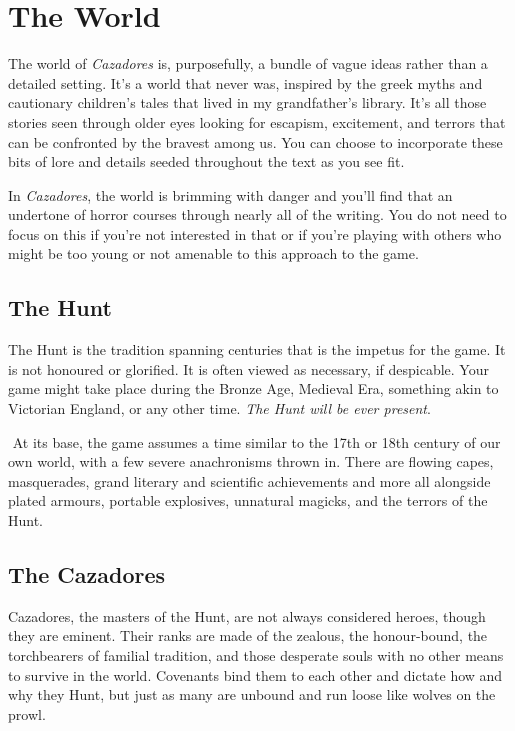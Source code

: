 \documentclass[
]{book}
\begin{document}
\hypertarget{worldsum}{%
\section{The World}\label{worldsum}}

The world of \emph{Cazadores} is, purposefully, a bundle of vague ideas rather than a detailed setting. It's a world that never was, inspired by the greek myths and cautionary children's tales that lived in my grandfather's library. It's all those stories seen through older eyes looking for escapism, excitement, and terrors that can be confronted by the bravest among us. You can choose to incorporate these bits of lore and details seeded throughout the text as you see fit.

In \emph{Cazadores}, the world is brimming with danger and you'll find that an undertone of horror courses through nearly all of the writing. You do not need to focus on this if you're not interested in that or if you're playing with others who might be too young or not amenable to this approach to the game.

\hypertarget{the-hunt}{%
\subsection*{The Hunt}\label{the-hunt}}

The Hunt is the tradition spanning centuries that is the impetus for the game. It is not honoured or glorified. It is often viewed as necessary, if despicable. Your game might take place during the Bronze Age, Medieval Era, something akin to Victorian England, or any other time. \emph{The Hunt will be ever present}.

 At its base, the game assumes a time similar to the 17th or 18th century of our own world, with a few severe anachronisms thrown in. There are flowing capes, masquerades, grand literary and scientific achievements and more all alongside plated armours, portable explosives, unnatural magicks, and the terrors of the Hunt.

\hypertarget{the-cazadores}{%
\subsection*{The Cazadores}\label{the-cazadores}}

Cazadores, the masters of the Hunt, are not always considered heroes, though they are eminent. Their ranks are made of the zealous, the honour-bound, the torchbearers of familial tradition, and those desperate souls with no other means to survive in the world. Covenants bind them to each other and dictate how and why they Hunt, but just as many are unbound and run loose like wolves on the prowl.
\end{document}
